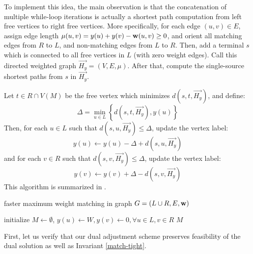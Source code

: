 To implement this idea, the main observation is that the concatenation of multiple while-loop iterations is actually a shortest path computation from left free vertices to right free vertices. More specifically, for each edge $(u, v)\in E$, assign edge length $\mu(u, v) = y(u) + y(v) - \mathbf{w}(u, v)\geq 0$, and orient all matching edges from $R$ to $L$, and non-matching edges from $L$ to $R$. Then, add a terminal $s$ which is connected to all free vertices in $L$ (with zero weight edges). Call this directed weighted graph $\overrightarrow{H_y} = (V, E, \mu)$. After that, compute the single-source shortest paths from $s$ in $\overrightarrow{H_y}$.

Let $t\in R\cap V(M)$ be the free vertex which minimizes $d(s, t, \overrightarrow{H_y})$, and define: $$\Delta = \min_{u\in L}\left\{d(s, t, \overrightarrow{H_y}), y(u)\right\}$$
Then, for each $u\in L$ such that $d(s, u, \overrightarrow{H_y})\leq \Delta$, update the vertex label: $$y(u)\leftarrow y(u) - \Delta + d(s, u, \overrightarrow{H_y})$$
and for each $v\in R$ such that $d(s, v, \overrightarrow{H_y})\leq \Delta$, update the vertex label:
$$y(v)\leftarrow y(v) + \Delta - d(s, v, \overrightarrow{H_y})$$
This algorithm is summarized in .

\begin{algorithm}
	\caption{faster maximum weight matching in graph $G = (L\cup R, E, \mathbf{w})$}\label{fast-hung}
	initialize $M \leftarrow \emptyset$, $y(u) \leftarrow W, y(v)\leftarrow 0, \forall u\in L, v\in R$\;
	\Return $M$\;
\end{algorithm}

First, let us verify that our dual adjustment scheme preserves feasibility of the dual solution as well as Invariant \ref{match-tight}.

